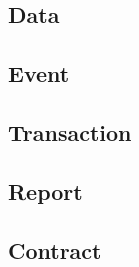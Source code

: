 {\setlength{\columnsep}{0pt}
  \subsection{Data}
  \vspace{-.25cm}
  

  \subsection{Event}
  \vspace{-.55cm}
  
  \vspace{-.5cm}

  \subsection{Transaction}
  \vspace{-.25cm}
  

  \subsection{Report}
  \vspace{-.25cm}
  

  \subsection{Contract}
  \vspace{-.25cm}
  
}

